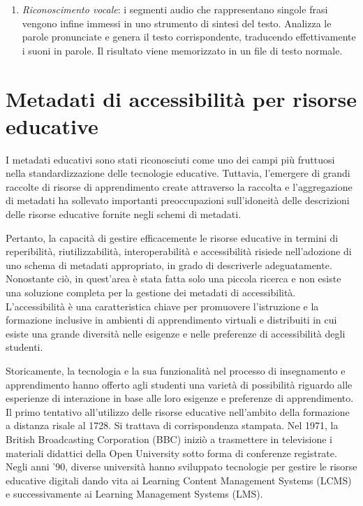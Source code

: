 \begin{enumerate}
\item \textit{Riconoscimento vocale}: i segmenti audio che rappresentano singole frasi vengono infine immessi in uno strumento di sintesi del testo. Analizza le parole pronunciate e genera il testo corrispondente, traducendo effettivamente i suoni in parole. Il risultato viene memorizzato in un file di testo normale.
\end{enumerate}

\section{Metadati di accessibilità per risorse educative}
I metadati educativi sono stati riconosciuti come uno dei campi più fruttuosi nella standardizzazione delle tecnologie educative. Tuttavia, l'emergere di grandi raccolte di risorse di apprendimento create attraverso la raccolta e l'aggregazione di metadati ha sollevato importanti preoccupazioni sull'idoneità delle descrizioni delle risorse educative fornite negli schemi di metadati.

Pertanto, la capacità di gestire efficacemente le risorse educative in termini di reperibilità, riutilizzabilità, interoperabilità e accessibilità risiede nell'adozione di uno schema di metadati appropriato, in grado di descriverle adeguatamente. Nonostante ciò, in quest'area è stata fatta solo una piccola ricerca e non esiste una soluzione completa per la gestione dei metadati di accessibilità. L'accessibilità è una caratteristica chiave per promuovere l'istruzione e la formazione inclusive in ambienti di apprendimento virtuali e distribuiti in cui esiste una grande diversità nelle esigenze e nelle preferenze di accessibilità degli studenti.

Storicamente, la tecnologia e la sua funzionalità nel processo di insegnamento e apprendimento hanno offerto agli studenti una varietà di possibilità riguardo alle esperienze di interazione in base alle loro esigenze e preferenze di apprendimento. Il primo tentativo all'utilizzo delle risorse educative nell'ambito della formazione a distanza risale al 1728. Si trattava di corrispondenza stampata. Nel 1971, la British Broadcasting Corporation (BBC) iniziò a trasmettere in televisione i materiali didattici della Open University sotto forma di conferenze registrate. Negli anni '90, diverse università hanno sviluppato tecnologie per gestire le risorse educative digitali dando vita ai Learning Content Management Systems (LCMS) e successivamente ai Learning Management Systems (LMS).

